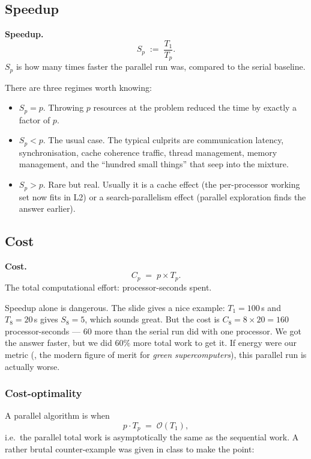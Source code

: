 \subsection{Speedup}

\begin{ppdefn}
\textbf{Speedup.}
\[
S_p \;:=\; \frac{T_1}{T_p}.
\]
$S_p$ is how many times faster the parallel run was, compared to the serial baseline.
\end{ppdefn}

There are three regimes worth knowing:

\begin{itemize}
  \item {} $S_p = p$. Throwing $p$ resources
        at the problem reduced the time by exactly a factor of $p$.
  \item {} $S_p < p$. The usual case. The typical
        culprits are communication latency, synchronisation, cache coherence
        traffic, thread management, memory management, and the ``hundred
        small things'' that seep into the mixture.
  \item {} $S_p > p$. Rare but real. Usually it
        is a cache effect (the per-processor working set now fits in L2) or a
        search-parallelism effect (parallel exploration finds the answer earlier).
\end{itemize}

\subsection{Cost}

\begin{ppdefn}
\textbf{Cost.}
\[
C_p \;=\; p \times T_p.
\]
The total computational effort: processor-seconds spent.
\end{ppdefn}

Speedup alone is dangerous. The slide gives a nice example: $T_1 = 100$\,s
and $T_8 = 20$\,s gives $S_8 = 5$, which sounds great. But the cost is
$C_8 = 8 \times 20 = 160$ processor-seconds --- 60 more than the serial run
did with one processor. We got the answer faster, but we did $60\%$ more
total work to get it. If energy were our metric (,
the modern figure of merit for \emph{green supercomputers}), this parallel
run is actually worse.

\subsubsection*{Cost-optimality}
A parallel algorithm is  when
\[
p \cdot T_p \;=\; \mathcal{O}(T_1),
\]
i.e.\ the parallel total work is asymptotically the same as the sequential
work. A rather brutal counter-example was given in class to make the point:

